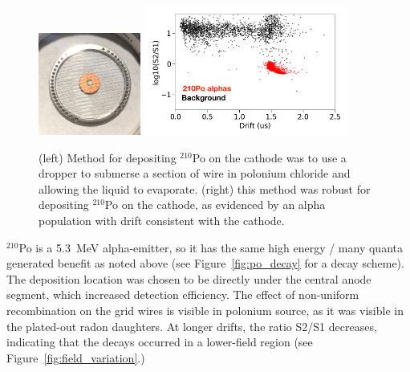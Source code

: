 \begin{figure}[htbp]
\begin{center}
\includegraphics[width=0.3\textwidth]{figures/etrains/po_on_wires.png}
\includegraphics[width=0.6\textwidth]{figures/etrains/po_drift.png}
\caption{(left) Method for depositing $^{210}$Po on the cathode was to use a dropper to submerse a section of wire in polonium chloride and allowing the liquid to evaporate. (right) this method was robust for depositing $^{210}$Po on the cathode, as evidenced by an alpha population with drift consistent with the cathode. }
\label{fig:polonium}
\end{center}
\end{figure}


$^{210}$Po is a 5.3~MeV alpha-emitter, so it has the same high energy / many quanta generated benefit as noted above (see Figure~\ref{fig:po_decay} for a decay scheme). The deposition location was chosen to be directly under the central anode segment, which increased detection efficiency. The effect of non-uniform recombination on the grid wires is visible in polonium source, as it was visible in the plated-out radon daughters. At longer drifts, the ratio S2/S1 decreases, indicating that the decays occurred in a lower-field region (see Figure~\ref{fig:field_variation}.)

